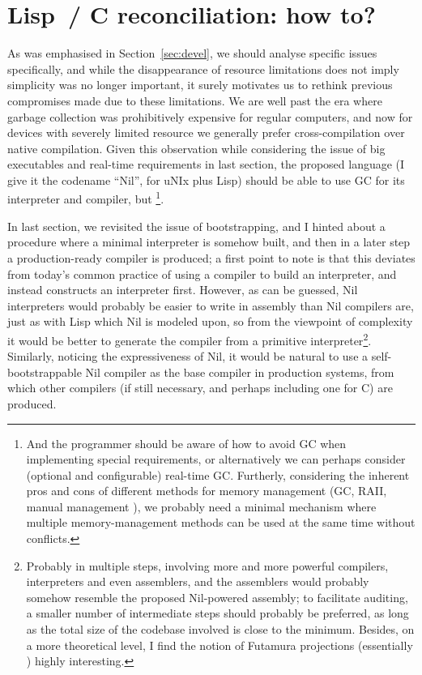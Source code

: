 \section{Lisp~/ C reconciliation: how to?}\label{sec:howto}

As was emphasised in Section~\ref{sec:devel}, we should analyse specific issues
specifically, and while the disappearance of resource limitations does not imply
simplicity was no longer important, it surely motivates us to rethink previous
compromises made due to these limitations.  We are well past the era where
garbage collection was prohibitively expensive for regular computers, and now
for devices with severely limited resource we generally prefer cross-compilation
over native compilation.  Given this observation while considering the issue
of big executables and real-time requirements in last section, the proposed
language (I give it the codename ``Nil'', for uNIx plus Lisp) should be able
to use GC for its interpreter and compiler, but \footnote%
{And the programmer should be aware of how to avoid GC when implementing
special requirements, or alternatively we can perhaps consider (optional and
configurable) real-time GC.  Furtherly, considering
the inherent pros and cons of different methods for memory management (GC, RAII,
manual management \etc), we probably need a minimal mechanism where multiple
memory-management methods can be used at the same time without conflicts.}.

In last section, we revisited the issue of bootstrapping, and I hinted about
a procedure where a minimal interpreter is somehow built, and then in a later
step a production-ready compiler is produced; a first point to note is that
this deviates from today's common practice of using a compiler to build an
interpreter, and instead constructs an interpreter first.  However, as can be
guessed, Nil interpreters would probably be easier to write in assembly than
Nil compilers are, just as with Lisp which Nil is modeled upon, so from the
viewpoint of complexity it would be better to generate the compiler from a
primitive interpreter\footnote{Probably in multiple steps, involving more and
more powerful compilers, interpreters and even assemblers, and the assemblers
would probably somehow resemble the proposed Nil-powered assembly; to facilitate
auditing, a smaller number of intermediate steps should probably be preferred,
as long as the total size of the codebase involved is close to the minimum.
Besides, on a more theoretical level, I find the notion of Futamura projections
(essentially ) highly
interesting.}.  Similarly, noticing the expressiveness of Nil, it would
be natural to use a self-bootstrappable Nil compiler as the base
compiler in production systems, from which other compilers (if
still necessary, and perhaps including one for C) are produced.

